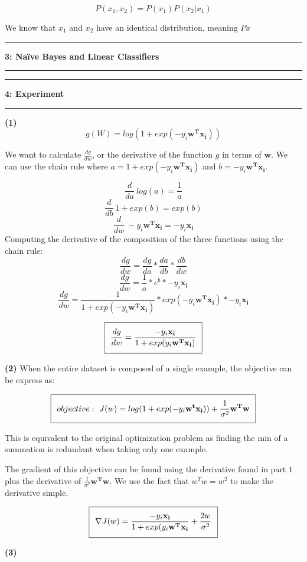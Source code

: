 \documentclass[11pt]{article}
\newcommand\question[2]{\vspace{.25in}\hrule\textbf{#1: #2}\vspace{.5em}\hrule\vspace{.10in}}
\renewcommand\part[1]{\vspace{.10in}\textbf{(#1)}}
\begin{document}
$$P(x_1, x_2) = P(x_1)P(x_2|x_1)$$

We know that $x_1$ and $x_2$ have an identical distribution, meaning $Px$


\question{3}{Na\"{i}ve Bayes and Linear Classifiers}

\question{4}{Experiment}

\part{1} 
$$g(W) = log(1 + exp(-y_i\mathbf{w^Tx_i}))$$

We want to calculate $\frac{dg}{dw}$, or the derivative of the function $g$ in terms of $\mathbf{w}$. We can use the chain rule where $a = 1 + exp(-y_i\mathbf{w^Tx_i})$ and $b = -y_i\mathbf{w^Tx_i}$.

$$\frac{d}{da} \ log(a) = \frac{1}{a}$$
$$\frac{d}{db} \ 1 + exp(b)= exp(b)$$
$$\frac{d}{dw} \ -y_i\mathbf{w^Tx_i} = -y_i\mathbf{x_i}$$
Computing the derivative of the composition of the three functions using the chain rule:
$$\frac{dg}{dw} = \frac{dg}{da} * \frac{da}{db} * \frac{db}{dw}$$
$$\frac{dg}{dw} = \frac{1}{a} * e^b * -y_i\mathbf{x_i}$$
$$\frac{dg}{dw} = \frac{1}{1 + exp(-y_i\mathbf{w^Tx_i})} * exp(-y_i\mathbf{w^Tx_i}) * -y_i\mathbf{x_i}$$

\begin{equation}
\setlength\fboxsep{0.25cm}
\setlength\fboxrule{0.4pt}
\boxed{\frac{dg}{dw} = \frac{-y_i\mathbf{x_i}}{1 + exp(y_i\mathbf{w^Tx_i})}}
\end{equation} 

\part{2} When the entire dataset is composed of a single example, the objective can be express as:

\begin{equation}
\setlength\fboxsep{0.25cm}
\setlength\fboxrule{0.4pt}
\boxed{objective:\ J(w) = log(1 + exp(-y_i\mathbf{w^tx_i})) + \frac{1}{\sigma^2}\mathbf{w^Tw}}
\end{equation}

This is equivalent to the original optimization problem as finding the min of a summation is redundant when taking only one example.

The gradient of this objective can be found using the derivative found in part $1$ plus the derivative of $\frac{1}{\sigma^2}\mathbf{w^Tw}$. We use the fact that $w^Tw = w^2$ to make the derivative simple.

\begin{equation}
\setlength\fboxsep{0.25cm}
\setlength\fboxrule{0.4pt}
\boxed{\nabla J(w) = \frac{-y_i\mathbf{x_i}}{1 + exp(y_i\mathbf{w^Tx_i}} + \frac{2w}{\sigma^2}}
\end{equation}

\part{3}
\end{document}
